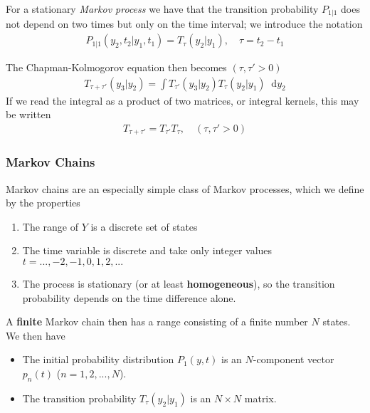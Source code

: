 \documentclass[twoside,english]{uiofysmaster}
\newcommand*\dif{\mathop{}\!\mathrm{d}}
\begin{document}
For a stationary \textit{Markov process} we have that the transition probability $P_{1|1}$ does not depend on two times but only on the time interval; we introduce the notation
\begin{align}
	P_{1|1} (y_2, t_2| y_1, t_1) = T_\tau (y_2|y_1), \quad \tau = t_2 - t_1
\end{align}

The Chapman-Kolmogorov equation then becomes $(\tau, \tau' > 0)$
\begin{align}
	T_{\tau+\tau'} (y_3 | y_2) = \int T_{\tau'} (y_3|y_2) T_\tau (y_2|y_1) \dif y_2
\end{align}
If we read the integral as a product of two matrices, or integral kernels, this may be written
\begin{align}
	T_{\tau + \tau'} = T_{\tau'} T_{\tau}, \quad (\tau, \tau' > 0)
\end{align}
\cite{VanKampen2007}

\subsubsection{Markov Chains}
Markov chains are an especially simple class of Markov processes, which we define by the properties
\begin{enumerate}
	\item The range of $Y$ is a discrete set of states
	\item The time variable is discrete and take only integer values $t=...,-2,-1,0,1,2,...$
	\item The process is stationary (or at least \textbf{homogeneous}), so the transition probability depends on the time difference alone.
\end{enumerate}
A \textbf{finite} Markov chain then has a range consisting of a finite number $N$ states. We then have
\begin{itemize}
	\item The initial probability distribution $P_1 (y, t)$ is an $N$-component vector $p_n(t)$ ($n=1,2,...,N$).
	\item The transition probability $T_\tau (y_2|y_1)$ is an $N\times N$ matrix.
\end{itemize}
\end{document}
